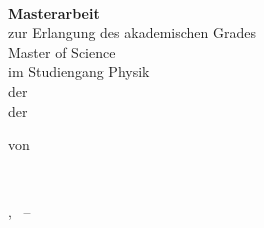 \begin{titlepage}
    \begin{addmargin}[-1cm]{-3cm}
    \begin{center}
        \large

        \hfill

        \vfill

        \begingroup
            \color{Maroon}\spacedallcaps{\myTitle} \\ \bigskip
        \endgroup


        \vfill

        \textbf{Masterarbeit}\\ \bigskip
        zur Erlangung des akademischen Grades\\
        Master of Science\\
        im Studiengang Physik\\
        der \myFaculty\\
        der \myUni\\ \bigskip

        \vfill
        
        von \\ \bigskip
        
        \spacedlowsmallcaps{\myName} \\ \bigskip
        
        \vfill

        \myLocation, \myTime\ -- \myVersion\\

        \vfill

    \end{center}
  \end{addmargin}
\end{titlepage}
